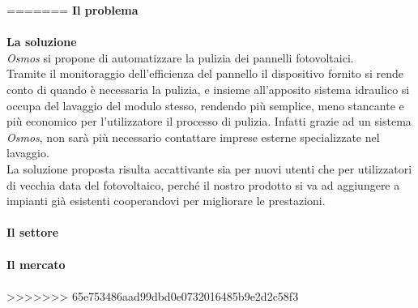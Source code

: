 \documentclass[a4paper, 12pt]{article}
\begin{document}
=======
	\textbf{Il problema}\\\\
	\textbf{La soluzione}\\
	\emph{Osmos} si propone di automatizzare la pulizia dei pannelli fotovoltaici.\\
	Tramite il monitoraggio dell'efficienza del pannello il dispositivo fornito si rende conto di quando è necessaria la pulizia, e insieme all'apposito sistema idraulico si occupa del lavaggio del modulo stesso, rendendo più semplice, meno stancante e più economico per l'utilizzatore il processo di pulizia. Infatti grazie ad un sistema \emph{Osmos}, non sarà più necessario contattare imprese esterne specializzate nel lavaggio.\\
	La soluzione proposta risulta accattivante sia per nuovi utenti che per utilizzatori di vecchia data del fotovoltaico, perché il nostro prodotto si va ad aggiungere a impianti già esistenti cooperandovi per migliorare le prestazioni.\\\\
	\textbf{Il settore}\\\\
	\textbf{Il mercato}\\\\
>>>>>>> 65e753486aad99dbd0e0732016485b9e2d2c58f3
	\newpage
\end{document}
